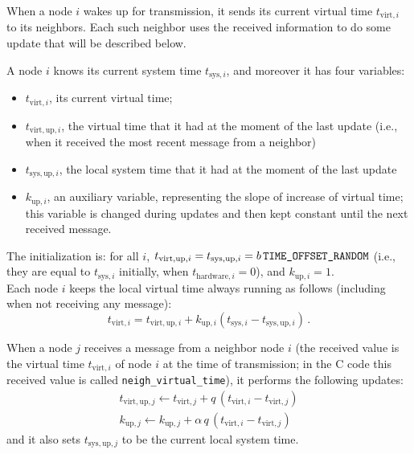 \documentclass[oneside]{article}
\begin{document}
When a node $i$ wakes up for transmission, it sends its current virtual time  $t_{\text{virt}, i}$ to its neighbors.
Each such neighbor uses the received information to do some update that will be described below.

A node $i$ knows its current system time $t_{\text{sys}, i}$, and moreover it has four variables:
\begin{itemize}
\item $t_{\text{virt}, i}$, its current virtual time;
\item $t_{\text{virt}, \text{up}, i}$, the virtual time that it had at the moment of the last update (i.e., when it received the most recent message from a neighbor)
\item  $t_{\text{sys}, \text{up}, i}$, the local system time that it had at the moment of the last update
\item $k_{\text{up},i}$, an	 auxiliary variable, representing the slope of increase of virtual time; this variable is changed during updates and then kept constant until the next received message.
\end{itemize}


The initialization is: for all $i$, $t_{\text{virt}, \text{up}, i}= t_{\text{sys}, \text{up}, i}= b \, \verb=TIME_OFFSET_RANDOM=  $ (i.e., they are equal to $t_{\text{sys}, i}$ initially, when $t_{\text{hardware}, i} =0$), and  $k_{\text{up},i}=1$. \\

Each node $i$ keeps the local virtual time always running as follows (including when not receiving any message):
\[ %
t_{\text{virt}, i} = t_{\text{virt}, \text{up}, i}
	+ k_{\text{up}, i}(t_{\text{sys},  i} - t_{\text{sys}, \text{up}, i}) \,.
\] %

When a node $j$ receives a message from a neighbor node $i$ (the received value  is the virtual time $t_{\text{virt}, i}$ of node $i$ at the time of transmission; in the C code this received value is called \verb=neigh_virtual_time=), it performs the following updates:
\begin{align*}
t_{\text{virt},\text{up}, j} \leftarrow
	t_{\text{virt}, j}
	+ q \, (t_{\text{virt}, i} - t_{\text{virt}, j})
 \\
k_{\text{up},j} \leftarrow
	k_{\text{up},j}
	+ \alpha \, q \, (t_{\text{virt}, i} - t_{\text{virt}, j})
\end{align*}
and it also sets $t_{\text{sys}, \text{up}, j}$ to be the current local system time.\\
\end{document}
